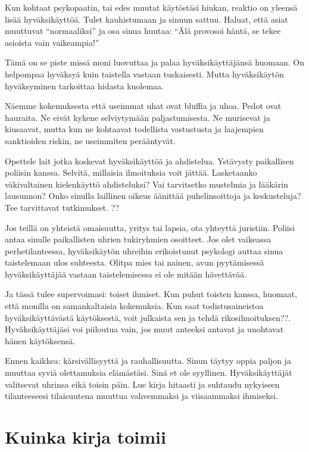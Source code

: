 Kun kohtaat psykopaatin, tai edes muutat käytöstäsi hiukan, reaktio on yleensä lisää hyväksikäyttöä. Tulet kauhistumaan ja sinuun sattuu. Haluat, että asiat muuttuvat ``normaaliksi\vmq{,}'' ja osa sinua huutaa: ``Älä provosoi häntä, se tekee asioista vain vaikeampia!''

Tämä on se piste missä moni luovuttaa ja palaa hyväksikäyttäjänsä huomaan. On helpompaa hyväksyä kuin taistella vastaan tuskaisesti. Mutta hyväksikäytön hyväksyminen tarkoittaa hidasta kuolemaa.

Näemme kokemuksesta että useimmat uhat ovat bluffia ja uhoa. Pedot ovat hauraita. Ne eivät kykene selviytymään paljastumisesta. Ne murisevat ja kiusaavat, mutta kun ne kohtaavat todellista vastustusta ja laajempien sanktioiden riskin, ne useimmiten perääntyvät.

Opettele lait jotka koskevat hyväksikäyttöä ja ahdistelua. Ystävysty paikallisen poliisin kanssa. Selvitä, millaisia ilmoituksia voit jättää. Lasketaanko väkivaltainen kielenkäyttö ahdisteluksi? Vai tarvitsetko mustelmia ja lääkärin lausunnon? Onko sinulla laillinen oikeus äänittää puhelinsoittoja ja keskusteluja? Tee tarvittavat tutkimukset. ??

Jos teillä on yhteistä omaisuutta, yritys tai lapsia, ota yhteyttä juristiin. Poliisi antaa sinulle paikallisten uhrien tukiryhmien osoitteet. Jos olet vaikeassa perhetilanteessa, hyväksikäytön uhreihin erikoistunut psykologi auttaa sinua taistelemaan ulos suhteesta. Olitpa mies tai nainen, avun pyytämisessä hyväksikäyttäjää vastaan taistelemisessa ei ole mitään hävettävää.

Ja tässä tulee supervoimasi: toiset ihmiset. Kun puhut toisten kanssa, huomaat, että monilla on samankaltaisia kokemuksia. Kun saat todistusaineistoa hyväksikäyttävästä käytöksestä, voit julkaista sen ja tehdä rikosilmoituksen??. Hyväksikäyttäjäsi voi piiloutua vain, jos muut anteeksi antavat ja unohtavat hänen käytöksensä.

Ennen kaikkea: kärsivällisyyttä ja rauhallisuutta. Sinun täytyy oppia paljon ja muuttaa syviä olettamuksia elämästäsi. Sinä et ole syyllinen. Hyväksikäyttäjät valitsevat uhrinsa eikä toisin päin. Lue kirja hitaasti ja suhtaudu nykyiseen tilanteeseesi tilaisuutena muuttua vahvemmaksi ja viisaammaksi ihmiseksi.

\section{Kuinka kirja toimii}

